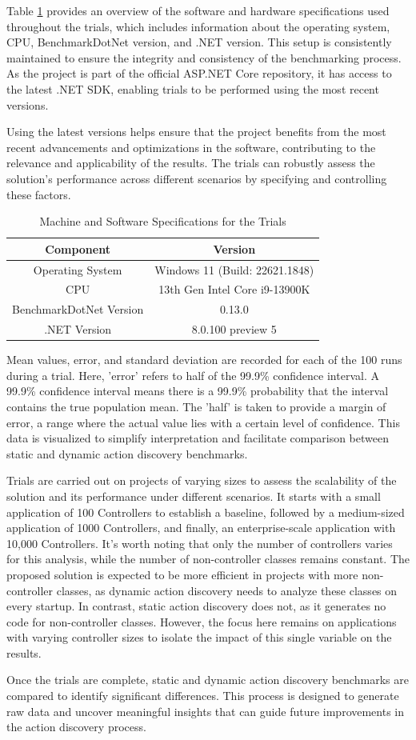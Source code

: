 Table \ref{table:specifications} provides an overview of the software and hardware specifications used throughout the trials, which includes information about the operating system, CPU, BenchmarkDotNet version, and .NET version. This setup is consistently maintained to ensure the integrity and consistency of the benchmarking process. As the project is part of the official ASP.NET Core repository, it has access to the latest .NET SDK, enabling trials to be performed using the most recent versions.

Using the latest versions helps ensure that the project benefits from the most recent advancements and optimizations in the software, contributing to the relevance and applicability of the results. The trials can robustly assess the solution's performance across different scenarios by specifying and controlling these factors.

\begin{table}[!ht]
\centering
\begin{tabular}{|c|c|}
\hline
\textbf{Component} & \textbf{Version} \\
\hline
Operating System & Windows 11 (Build: 22621.1848) \\
\hline
CPU & 13th Gen Intel Core i9-13900K \\
\hline
BenchmarkDotNet Version & 0.13.0 \\
\hline
.NET Version & 8.0.100 preview 5 \\
\hline
\end{tabular}
\caption{Machine and Software Specifications for the Trials}
\label{table:specifications}
\end{table}

Mean values, error, and standard deviation are recorded for each of the 100 runs during a trial. Here, 'error' refers to half of the 99.9\% confidence interval. A 99.9\% confidence interval means there is a 99.9\% probability that the interval contains the true population mean. The 'half' is taken to provide a margin of error, a range where the actual value lies with a certain level of confidence. This data is visualized to simplify interpretation and facilitate comparison between static and dynamic action discovery benchmarks.

Trials are carried out on projects of varying sizes to assess the scalability of the solution and its performance under different scenarios. It starts with a small application of 100 Controllers to establish a baseline, followed by a medium-sized application of 1000 Controllers, and finally, an enterprise-scale application with 10,000 Controllers. It's worth noting that only the number of controllers varies for this analysis, while the number of non-controller classes remains constant. The proposed solution is expected to be more efficient in projects with more non-controller classes, as dynamic action discovery needs to analyze these classes on every startup. In contrast, static action discovery does not, as it generates no code for non-controller classes. However, the focus here remains on applications with varying controller sizes to isolate the impact of this single variable on the results.

Once the trials are complete, static and dynamic action discovery benchmarks are compared to identify significant differences. This process is designed to generate raw data and uncover meaningful insights that can guide future improvements in the action discovery process.
